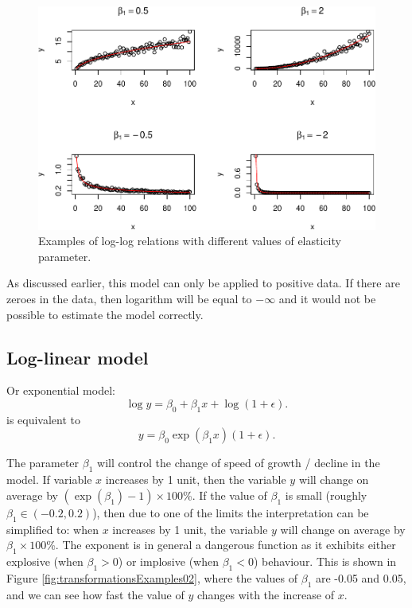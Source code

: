 \documentclass[
]{book}
\theoremstyle{definition}
\theoremstyle{definition}
\theoremstyle{definition}
\theoremstyle{definition}
\theoremstyle{remark}
\begin{document}
\begin{figure}
\centering
\includegraphics{Svetunkov---Statistics-for-Business-Analytics_files/figure-latex/transformationsExamples01-1.pdf}
\caption{\label{fig:transformationsExamples01}Examples of log-log relations with different values of elasticity parameter.}
\end{figure}

As discussed earlier, this model can only be applied to positive data. If there are zeroes in the data, then logarithm will be equal to \(-\infty\) and it would not be possible to estimate the model correctly.

\hypertarget{log-linear-model}{%
\subsection{Log-linear model}\label{log-linear-model}}

Or exponential model:
\begin{equation}
    \log y = \beta_0 + \beta_1 x + \log (1+\epsilon) .
    \label{eq:transformLogLinear}
\end{equation}
is equivalent to
\begin{equation}
    y = \beta_0 \exp(\beta_1 x) (1+\epsilon) .
    \label{eq:transformExponential}
\end{equation}

The parameter \(\beta_1\) will control the change of speed of growth / decline in the model. If variable \(x\) increases by 1 unit, then the variable \(y\) will change on average by \((\exp(\beta_1)-1)\times 100\)\%. If the value of \(\beta_1\) is small (roughly \(\beta_1 \in (-0.2, 0.2)\)), then due to one of the limits the interpretation can be simplified to: when \(x\) increases by 1 unit, the variable \(y\) will change on average by \(\beta_1\times 100\)\%. The exponent is in general a dangerous function as it exhibits either explosive (when \(\beta_1 > 0\)) or implosive (when \(\beta_1 < 0\)) behaviour. This is shown in Figure \ref{fig:transformationsExamples02}, where the values of \(\beta_1\) are -0.05 and 0.05, and we can see how fast the value of \(y\) changes with the increase of \(x\).
\end{document}
